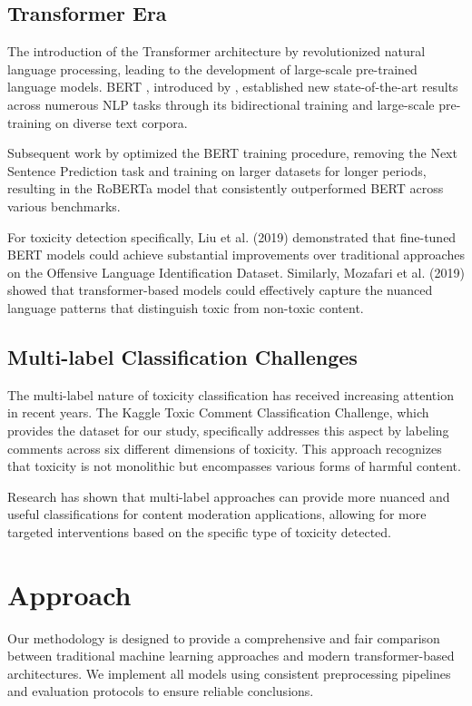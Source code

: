 \documentclass[11pt]{article}
\begin{document}
\subsection{Transformer Era}

The introduction of the Transformer architecture by \citet{vaswani2017attention} revolutionized natural language processing, leading to the development of large-scale pre-trained language models. BERT \cite{bert}, introduced by \citet{bert}, established new state-of-the-art results across numerous NLP tasks through its bidirectional training and large-scale pre-training on diverse text corpora.

Subsequent work by \citet{roberta} optimized the BERT training procedure, removing the Next Sentence Prediction task and training on larger datasets for longer periods, resulting in the RoBERTa model that consistently outperformed BERT across various benchmarks.

For toxicity detection specifically, Liu et al. (2019) demonstrated that fine-tuned BERT models could achieve substantial improvements over traditional approaches on the Offensive Language Identification Dataset. Similarly, Mozafari et al. (2019) showed that transformer-based models could effectively capture the nuanced language patterns that distinguish toxic from non-toxic content.

\subsection{Multi-label Classification Challenges}

The multi-label nature of toxicity classification has received increasing attention in recent years. The Kaggle Toxic Comment Classification Challenge, which provides the dataset for our study, specifically addresses this aspect by labeling comments across six different dimensions of toxicity. This approach recognizes that toxicity is not monolithic but encompasses various forms of harmful content.

Research has shown that multi-label approaches can provide more nuanced and useful classifications for content moderation applications, allowing for more targeted interventions based on the specific type of toxicity detected.

\section{Approach}

Our methodology is designed to provide a comprehensive and fair comparison between traditional machine learning approaches and modern transformer-based architectures. We implement all models using consistent preprocessing pipelines and evaluation protocols to ensure reliable conclusions.
\end{document}
